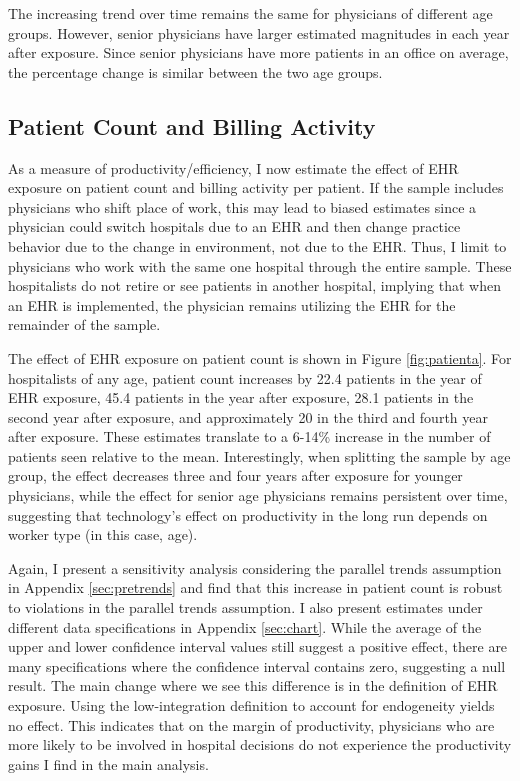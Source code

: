 \documentclass[12pt]{article}
\begin{document}
The increasing trend over time remains the same for physicians of different age groups. However, senior physicians have larger estimated magnitudes in each year after exposure. Since senior physicians have more patients in an office on average, the percentage change is similar between the two age groups. 



\subsection{Patient Count and Billing Activity}\label{sec:patientcount}

As a measure of productivity/efficiency, I now estimate the effect of EHR exposure on patient count and billing activity per patient. If the sample includes physicians who shift place of work, this may lead to biased estimates since a physician could switch hospitals due to an EHR and then change practice behavior due to the change in environment, not due to the EHR. Thus, I limit to physicians who work with the same one hospital through the entire sample. These hospitalists do not retire or see patients in another hospital, implying that when an EHR is implemented, the physician remains utilizing the EHR for the remainder of the sample. 

The effect of EHR exposure on patient count is shown in Figure \ref{fig:patienta}. For hospitalists of any age, patient count increases by 22.4 patients in the year of EHR exposure, 45.4 patients in the year after exposure, 28.1 patients in the second year after exposure, and approximately 20 in the third and fourth year after exposure. These estimates translate to a 6-14\% increase in the number of patients seen relative to the mean. Interestingly, when splitting the sample by age group, the effect decreases three and four years after exposure for younger physicians, while the effect for senior age physicians remains persistent over time, suggesting that technology's effect on productivity in the long run depends on worker type (in this case, age). 

Again, I present a sensitivity analysis considering the parallel trends assumption in Appendix \ref{sec:pretrends} and find that this increase in patient count is robust to violations in the parallel trends assumption. I also present estimates under different data specifications in Appendix \ref{sec:chart}. While the average of the upper and lower confidence interval values still suggest a positive effect, there are many specifications where the confidence interval contains zero, suggesting a null result. The main change where we see this difference is in the definition of EHR exposure. Using the low-integration definition to account for endogeneity yields no effect. This indicates that on the margin of productivity, physicians who are more likely to be involved in hospital decisions do not experience the productivity gains I find in the main analysis. 
\end{document}
